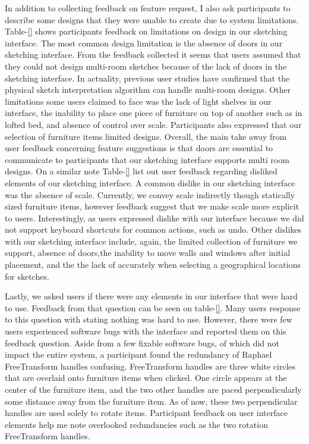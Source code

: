 In addition to collecting feedback on feature request, I also ask participants to describe some designs that they were unable to create due to system limitations.
Table-\ref{} shows participants feedback on limitations on design in our sketching interface.
The most common design limitation is the absence of doors in our sketching interface.
From  the feedback collected it seems that users assumed that they could not design multi-room sketches because of the lack of doors in the sketching interface.
In actuality, previous user studies have confirmed that the physical sketch interpretation algorithm can handle multi-room designs\cite{}.
Other limitations some users claimed to face was the lack of light shelves in our interface, the inability to place one piece of furniture on top of another such as in lofted bed, and absence of control over scale.
Participants also expressed that our selection of furniture items limited designs.
Overall, the main take away from user feedback concerning feature suggestions is that doors are essential to communicate to participants that our sketching interface supports multi room designs.
On a similar note Table-\ref{} list out user feedback regarding disliked elements of our sketching interface.
A common dislike in our sketching interface was the absence of scale.
Currently, we convey scale indirectly though statically sized furniture items, however feedback suggest that we make scale more explicit to users.
Interestingly, as users expressed dislike with our interface because we did not support keyboard shortcuts for common actions, such as undo.
Other dislikes with our sketching interface include, again, the limited collection of furniture we support, absence of doors,the inability to move walls and windows after initial placement, and the the lack of accurately when selecting a geographical locations for sketches.

Lastly, we asked users if there were any elements in our interface that were hard to use.
Feedback from that question can be seen on table-\ref{}.
Many users response to this question with stating nothing was hard to use.
However, there were few users experienced software bugs with the interface and reported them on this feedback question.
Aside from a few fixable software bugs, of which did not impact the entire system, a participant found the redundancy of Raphael FreeTransform handles confusing.
FreeTransform handles are three white circles that are overlaid onto furniture items when clicked.
One circle appears at the center of the furniture item, and the two other handles are paced perpendicularly some distance away from the furniture item.
As of now, these two perpendicular handles are used solely to rotate items.
Participant feedback on user interface elements help me note overlooked redundancies such as the two rotation FreeTransform handles.

